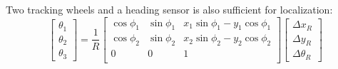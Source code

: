 \documentclass{article}
\begin{document}
Two tracking wheels and a heading sensor is also sufficient for localization:
$$
\begin{bmatrix}
    \theta_1\\
    \theta_2\\
    \theta_3
\end{bmatrix}
=
\frac{1}{R}
\begin{bmatrix}
    \operatorname{cos} \phi_1 & \operatorname{sin} \phi_1 & x_1 \operatorname{sin} \phi_1 - y_1 \operatorname{cos} \phi_1 \\
    \operatorname{cos} \phi_2 & \operatorname{sin} \phi_2 & x_2 \operatorname{sin} \phi_2 - y_2 \operatorname{cos} \phi_2 \\
    0 & 0 & 1\\
\end{bmatrix}
\begin{bmatrix}
    \Delta x_R\\
    \Delta y_R\\
    \Delta \theta_R
\end{bmatrix}
$$
\end{document}
